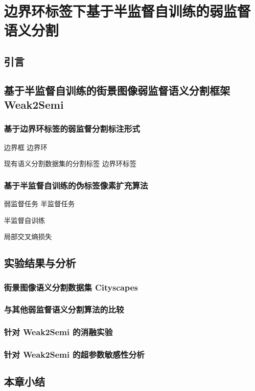 \chapter{边界环标签下基于半监督自训练的弱监督语义分割}
\section{引言}
\section{基于半监督自训练的街景图像弱监督语义分割框架 Weak2Semi}
\subsection{基于边界环标签的弱监督分割标注形式}
边界框 \rightarrow 边界环
\par
现有语义分割数据集的分割标签 \rightarrow 边界环标签
\subsection{基于半监督自训练的伪标签像素扩充算法}
弱监督任务 \rightarrow 半监督任务
\par
半监督自训练
\par
局部交叉熵损失
\section{实验结果与分析}
\subsection{街景图像语义分割数据集 Cityscapes}
\subsection{与其他弱监督语义分割算法的比较}
\subsection{针对 Weak2Semi 的消融实验}
\subsection{针对 Weak2Semi 的超参数敏感性分析}
\section{本章小结}
